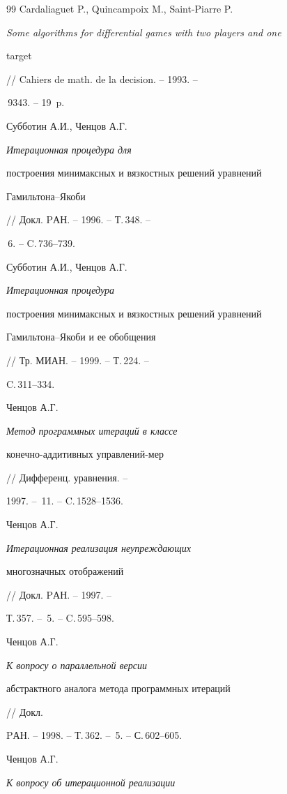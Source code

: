 \begin{thebibliography}{99}
 Cardaliaguet P., Quincampoix M., Saint-Piarre P.


{\em Some algorithms for differential games with two players and one


target} // Cahiers de math. de la decision. -- 1993. --


\No\,9343. -- 19~p.





 Субботин А.И., Ченцов А.Г. {\em Итерационная процедура для


построения минимаксных и вязкостных решений уравнений


Гамильтона--Якоби} // Докл. PАН. -- 1996. -- Т.\,348. --


\No\,6. -- C.\,736--739.





 Субботин А.И., Ченцов А.Г. {\em Итерационная процедура


построения минимаксных и вязкостных решений уравнений


Гамильтона--Якоби и ее обобщения} // Тр. МИАН. -- 1999. -- Т.\,224. --


C.\,311--334.





 Ченцов А.Г. {\em Метод программных итераций в классе


конечно-аддитивных управлений-мер} // Дифференц. уравнения. --


1997. -- \No\,11. -- C.\,1528--1536.





 Ченцов А.Г. {\em Итерационная реализация неупреждающих


многозначных отображений} // Докл. PАН. -- 1997. --


Т.\,357. -- \No\,5. -- C.\,595--598.





 Ченцов А.Г. {\em К вопросу о параллельной версии


абстрактного аналога метода программных итераций} // Докл.


PАН. -- 1998. -- Т.\,362. -- \No\,5. -- С.\,602--605.





 Ченцов А.Г. {\em К вопросу об итерационной реализации


}
\end{thebibliography}
